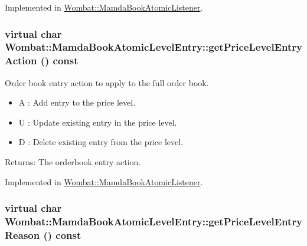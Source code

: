 Implemented in \hyperlink{classWombat_1_1MamdaBookAtomicListener_0ea6d18818fa9ec05f3e678e0aa58a35}{Wombat::Mamda\-Book\-Atomic\-Listener}.\hypertarget{classWombat_1_1MamdaBookAtomicLevelEntry_685db14a553ce94346b62f7d7b8b5b5a}{
\subsubsection[getPriceLevelEntryAction]{\setlength{\rightskip}{0pt plus 5cm}virtual char Wombat::Mamda\-Book\-Atomic\-Level\-Entry::get\-Price\-Level\-Entry\-Action () const}}
\label{classWombat_1_1MamdaBookAtomicLevelEntry_685db14a553ce94346b62f7d7b8b5b5a}


Order book entry action to apply to the full order book. 

\begin{itemize}
\item A : Add entry to the price level. \item U : Update existing entry in the price level. \item D : Delete existing entry from the price level. \end{itemize}


\begin{Desc}
\item[Returns:]The orderbook entry action. \end{Desc}


Implemented in \hyperlink{classWombat_1_1MamdaBookAtomicListener_561b2a785ed0546d0d1d2097b77a4f91}{Wombat::Mamda\-Book\-Atomic\-Listener}.\hypertarget{classWombat_1_1MamdaBookAtomicLevelEntry_222418d457ef30752c22e8aa63a61b50}{
\subsubsection[getPriceLevelEntryReason]{\setlength{\rightskip}{0pt plus 5cm}virtual char Wombat::Mamda\-Book\-Atomic\-Level\-Entry::get\-Price\-Level\-Entry\-Reason () const}}
\label{classWombat_1_1MamdaBookAtomicLevelEntry_222418d457ef30752c22e8aa63a61b50}


